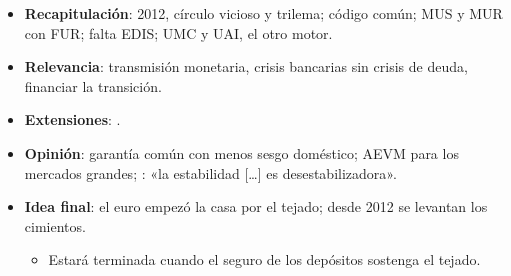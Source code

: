 \documentclass{article}
\begin{document}
\begin{columnas}
\begin{itemize}
\item \textbf{Recapitulación}: 2012, círculo vicioso y trilema; código común; MUS y MUR con FUR; falta EDIS; UMC y UAI, el otro motor.
\item \textbf{Relevancia}: transmisión monetaria, crisis bancarias sin crisis de deuda, financiar la transición.
\item \textbf{Extensiones}:      .
\item \textbf{Opinión}: garantía común con menos sesgo doméstico; AEVM para los mercados grandes; : «la estabilidad [\ldots] es desestabilizadora».
\item \textbf{Idea final}: el euro empezó la casa por el tejado; desde 2012 se levantan los cimientos.
  \begin{itemize}
  \item Estará terminada cuando el seguro de los depósitos sostenga el tejado.
  \end{itemize}
\end{itemize}


\end{columnas}
\end{document}
